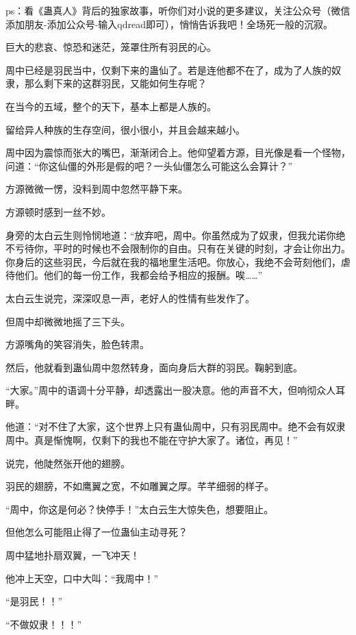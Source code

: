 
\begin{this_body}

ps：看《蛊真人》背后的独家故事，听你们对小说的更多建议，关注公众号（微信添加朋友-添加公众号-输入qdread即可），悄悄告诉我吧！全场死一般的沉寂。

巨大的悲哀、惊恐和迷茫，笼罩住所有羽民的心。

周中已经是羽民当中，仅剩下来的蛊仙了。若是连他都不在了，成为了人族的奴隶，那么剩下来的这群羽民，又能如何生存呢？

在当今的五域，整个的天下，基本上都是人族的。

留给异人种族的生存空间，很小很小，并且会越来越小。

周中因为震惊而张大的嘴巴，渐渐闭合上。他仰望着方源，目光像是看一个怪物，问道：“你这仙僵的外形是假的吧？一头仙僵怎么可能这么会算计？”

方源微微一愣，没料到周中忽然平静下来。

方源顿时感到一丝不妙。

身旁的太白云生则怜悯地道：“放弃吧，周中。你虽然成为了奴隶，但我允诺你绝不亏待你，平时的时候也不会限制你的自由。只有在关键的时刻，才会让你出力。你身后的这些羽民，今后就在我的福地里生活吧。你放心，我绝不会苛刻他们，虐待他们。他们的每一份工作，我都会给予相应的报酬。唉……”

太白云生说完，深深叹息一声，老好人的性情有些发作了。

但周中却微微地摇了三下头。

方源嘴角的笑容消失，脸色转肃。

然后，他就看到蛊仙周中忽然转身，面向身后大群的羽民。鞠躬到底。

“大家。”周中的语调十分平静，却透露出一股决意。他的声音不大，但响彻众人耳畔。

他道：“对不住了大家，这个世界上只有蛊仙周中，只有羽民周中。绝不会有奴隶周中。真是惭愧啊，仅剩下的我也不能在守护大家了。诸位，再见！”

说完，他陡然张开他的翅膀。

羽民的翅膀，不如鹰翼之宽，不如雕翼之厚。芊芊细弱的样子。

“周中，你这是何必？快停手！”太白云生大惊失色，想要阻止。

但他怎么可能阻止得了一位蛊仙主动寻死？

周中猛地扑扇双翼，一飞冲天！

他冲上天空，口中大叫：“我周中！”

“是羽民！！”

“不做奴隶！！！”


\end{this_body}
